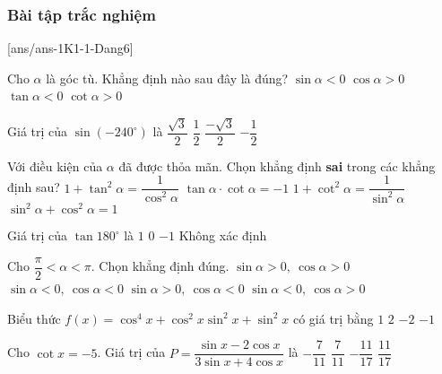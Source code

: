 \subsubsection{Bài tập trắc nghiệm}
[ans/ans-1K1-1-Dang6]
\begin{ex}%
	Cho $\alpha$ là góc tù. Khẳng định nào sau đây là đúng?
	\choice
	{$\sin{\alpha}<0$}
	{$\cos{\alpha}>0$}
	{\True $\tan{\alpha}<0$}
	{$\cot{\alpha}>0$}
\end{ex}
\begin{ex}%
	Giá trị của $\sin{(-240^{\circ})}$ là
	\choice
	{\True$\dfrac{\sqrt{3}}{2}$}
	{$\dfrac{1}{2}$}
	{$\dfrac{-\sqrt{3}}{2}$}
	{$-\dfrac{1}{2}$}
\end{ex}
\begin{ex}%
	Với điều kiện của $\alpha$ đã được thỏa mãn. Chọn khẳng định \textbf{sai} trong các khẳng định sau?
	\choice
	{$1+\tan^2{\alpha}=\dfrac{1}{\cos^2{\alpha}}$}
	{\True$\tan{\alpha}\cdot\cot{\alpha}=-1$}
	{$1+\cot^2{\alpha}=\dfrac{1}{\sin^2{\alpha}}$}
	{$\sin^2{\alpha}+\cos^2{\alpha}=1$}
\end{ex}
\begin{ex}%
	Giá trị của $\tan{180^{\circ}}$ là
	\choice
	{$1$}
	{\True$0$}
	{$-1$}
	{Không xác định}
\end{ex}
\begin{ex}%
	Cho $\dfrac{\pi}{2}<\alpha<\pi$. Chọn khẳng định đúng.
	\choice
	{$\sin{\alpha}>0,\ \cos{\alpha}>0$}
	{$\sin{\alpha}<0,\ \cos{\alpha}<0$}
	{\True $\sin{\alpha}>0,\ \cos{\alpha}<0$}
	{$\sin{\alpha}<0,\ \cos{\alpha}>0$}
\end{ex}
\begin{ex}%
	Biểu thức $f(x)=\cos^4{x}+\cos^2{x}\sin^2{x}+\sin^2{x}$ có giá trị bằng
	\choice
	{\True $1$}
	{$2$}
	{$-2$}
	{$-1$}
\end{ex}
\begin{ex}%
	Cho $\cot x=-5$. Giá trị của $P=\dfrac{\sin x-2\cos x}{3\sin x+4\cos x}$ là
	\choice
	{$-\dfrac{7 }{11}$}
	{$\dfrac{ 7}{11}$}
	{\True $-\dfrac{11 }{17}$}
	{$\dfrac{11}{17}$}
\end{ex}


